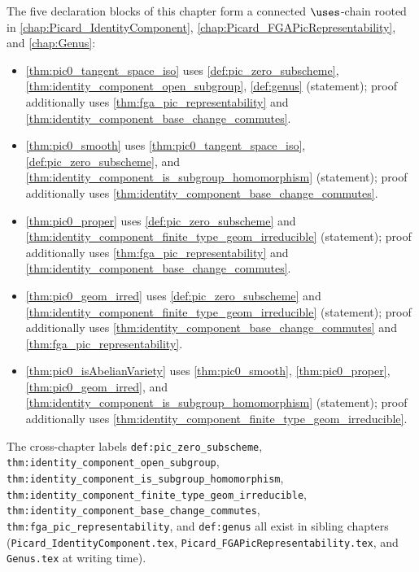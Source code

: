 The five declaration blocks of this chapter form a connected
\(\uses\)-chain rooted in
\cref{chap:Picard_IdentityComponent},
\cref{chap:Picard_FGAPicRepresentability}, and \cref{chap:Genus}:

\begin{itemize}
  \item \cref{thm:pic0_tangent_space_iso} uses
    \cref{def:pic_zero_subscheme},
    \cref{thm:identity_component_open_subgroup},
    \cref{def:genus} (statement); proof additionally uses
    \cref{thm:fga_pic_representability} and
    \cref{thm:identity_component_base_change_commutes}.
  \item \cref{thm:pic0_smooth} uses
    \cref{thm:pic0_tangent_space_iso},
    \cref{def:pic_zero_subscheme}, and
    \cref{thm:identity_component_is_subgroup_homomorphism} (statement);
    proof additionally uses
    \cref{thm:identity_component_base_change_commutes}.
  \item \cref{thm:pic0_proper} uses
    \cref{def:pic_zero_subscheme} and
    \cref{thm:identity_component_finite_type_geom_irreducible}
    (statement); proof additionally uses
    \cref{thm:fga_pic_representability} and
    \cref{thm:identity_component_base_change_commutes}.
  \item \cref{thm:pic0_geom_irred} uses
    \cref{def:pic_zero_subscheme} and
    \cref{thm:identity_component_finite_type_geom_irreducible}
    (statement); proof additionally uses
    \cref{thm:identity_component_base_change_commutes} and
    \cref{thm:fga_pic_representability}.
  \item \cref{thm:pic0_isAbelianVariety} uses
    \cref{thm:pic0_smooth},
    \cref{thm:pic0_proper},
    \cref{thm:pic0_geom_irred}, and
    \cref{thm:identity_component_is_subgroup_homomorphism}
    (statement); proof additionally uses
    \cref{thm:identity_component_finite_type_geom_irreducible}.
\end{itemize}

The cross-chapter labels
\texttt{def:pic\_zero\_subscheme},
\texttt{thm:identity\_component\_open\_subgroup},
\texttt{thm:identity\_component\_is\_subgroup\_homomorphism},
\texttt{thm:identity\_component\_finite\_type\_geom\_irreducible},
\texttt{thm:identity\_component\_base\_change\_commutes},
\texttt{thm:fga\_pic\_representability}, and
\texttt{def:genus} all exist in sibling chapters
(\texttt{Picard\_IdentityComponent.tex},
\texttt{Picard\_FGAPicRepresentability.tex}, and \texttt{Genus.tex} at
writing time).
